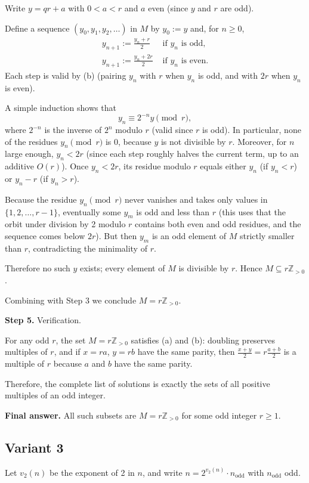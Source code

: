 \documentclass[12pt,a4paper]{article}
\theoremstyle{definition}
\begin{document}
    Write $y = qr + a$ with $0 < a < r$ and $a$ even (since $y$ and $r$ are odd).

    Define a sequence $(y_0, y_1, y_2, \ldots)$ in $M$ by $y_0 := y$ and, for $n \geq 0$,
    \begin{align}
        y_{n+1} := \frac{y_n + r}{2} &\text{ if } y_n \text{ is odd}, \\
        y_{n+1} := \frac{y_n + 2r}{2} &\text{ if } y_n \text{ is even}.
    \end{align}
    Each step is valid by (b) (pairing $y_n$ with $r$ when $y_n$ is odd, and with $2r$ when $y_n$ is even).

    A simple induction shows that
    $$y_n \equiv 2^{-n} y \pmod{r},$$
    where $2^{-n}$ is the inverse of $2^n$ modulo $r$ (valid since $r$ is odd). In particular, none of the residues $y_n \pmod{r}$ is 0, because $y$ is not divisible by $r$. Moreover, for $n$ large enough, $y_n < 2r$ (since each step roughly halves the current term, up to an additive $O(r)$). Once $y_n < 2r$, its residue modulo $r$ equals either $y_n$ (if $y_n < r$) or $y_n - r$ (if $y_n > r$).

    Because the residue $y_n \pmod{r}$ never vanishes and takes only values in $\{1,2,\ldots,r-1\}$, eventually some $y_m$ is odd and less than $r$ (this uses that the orbit under division by 2 modulo $r$ contains both even and odd residues, and the sequence comes below $2r$). But then $y_m$ is an odd element of $M$ strictly smaller than $r$, contradicting the minimality of $r$.

    Therefore no such $y$ exists; every element of $M$ is divisible by $r$. Hence $M \subseteq r\mathbb{Z}_{>0}$.

    Combining with Step 3 we conclude $M = r\mathbb{Z}_{>0}$.

    \textbf{Step 5.} Verification.

    For any odd $r$, the set $M = r\mathbb{Z}_{>0}$ satisfies (a) and (b): doubling preserves multiples of $r$, and if $x = ra$, $y = rb$ have the same parity, then $\frac{x+y}{2} = r\frac{a+b}{2}$ is a multiple of $r$ because $a$ and $b$ have the same parity.

    Therefore, the complete list of solutions is exactly the sets of all positive multiples of an odd integer.

    \textbf{Final answer.}
    All such subsets are $M = r \mathbb{Z}_{>0}$ for some odd integer $r \geq 1$.
    \subsection{Variant 3}
    Let $v_2(n)$ be the exponent of 2 in $n$, and write $n = 2^{v_2(n)} \cdot n_{\text{odd}}$ with $n_{\text{odd}}$ odd.
\end{document}
